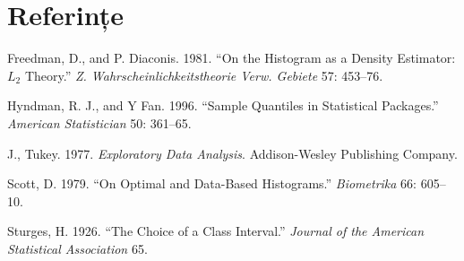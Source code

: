 \documentclass[]{article}
\begin{document}
\section*{Referințe}\label{referinte}

\hypertarget{refs}{}
\hypertarget{ref-FreedmanDiaconis1981}{}
Freedman, D., and P. Diaconis. 1981. ``On the Histogram as a Density
Estimator: \(L_2\) Theory.'' \emph{Z. Wahrscheinlichkeitstheorie Verw.
Gebiete} 57: 453--76.

\hypertarget{ref-Hyndman1996}{}
Hyndman, R. J., and Y Fan. 1996. ``Sample Quantiles in Statistical
Packages.'' \emph{American Statistician} 50: 361--65.

\hypertarget{ref-Tukey1977}{}
J., Tukey. 1977. \emph{Exploratory Data Analysis}. Addison-Wesley
Publishing Company.

\hypertarget{ref-Scott1979}{}
Scott, D. 1979. ``On Optimal and Data-Based Histograms.''
\emph{Biometrika} 66: 605--10.

\hypertarget{ref-Sturges1926}{}
Sturges, H. 1926. ``The Choice of a Class Interval.'' \emph{Journal of
the American Statistical Association} 65.
\end{document}
